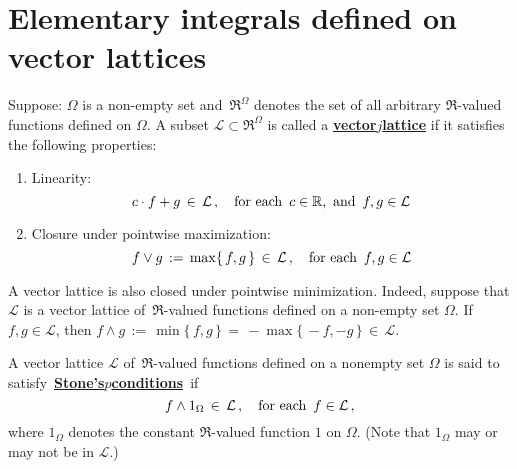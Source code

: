 

\section{Elementary integrals defined on vector lattices}
\setcounter{theorem}{0}
\setcounter{equation}{0}


\renewcommand{\theenumi}{\roman{enumi}}
\renewcommand{\labelenumi}{\textnormal{(\theenumi)}$\;\;$}


\begin{definition}
\mbox{}\vskip 0.1cm
\noindent
Suppose:\;\; $\Omega$ is a non-empty set and \,$\Re^{\Omega}$ denotes the set of all arbitrary $\Re$-valued functions
defined on $\Omega$. A subset $\mathcal{L} \subset \Re^{\Omega}$ is called a
\underline{\textbf{vector{\color{white}$j$\!}lattice}} if it satisfies the following properties:
\begin{enumerate}
\item
	Linearity:
	\begin{equation*}
	c \cdot f + g \,\in\, \mathcal{L}\,,
	\quad
	\textnormal{for each \,$c\in\Re$,\, and \,$f,g\in\mathcal{L}$}
	\end{equation*}
\item
	Closure under pointwise maximization:
	\begin{equation*}
	f \vee g \,:=\, \max\{\,f,g\,\} \,\in\, \mathcal{L}\,,
	\quad
	\textnormal{for each \,$f,g\in\mathcal{L}$}
	\end{equation*}
\end{enumerate}
\end{definition}

\begin{remark}\quad
A vector lattice is also closed under pointwise minimization.
Indeed, suppose that $\mathcal{L}$ is a vector lattice of
\,$\Re$-valued functions defined on a non-empty set $\Omega$.
If $f, g \in \mathcal{L}$, then
$f \wedge g \,:=\, \min\{\,f,g\,\} \,=\, -\max\{\,-f,-g\,\} \,\in\, \mathcal{L}$.
\end{remark}


\begin{definition}
\mbox{}\vskip 0.1cm
\noindent
A vector lattice $\mathcal{L}$ of \,$\Re$-valued functions defined on a nonempty set $\Omega$
is said to satisfy \,\underline{\textbf{Stone's{\color{white}$p$\!}conditions}}\, if
\begin{equation*}
f \wedge 1_{\Omega} \,\in\, \mathcal{L}\,,
\quad\textnormal{for each \,$f \in \mathcal{L}$}\,,
\end{equation*}
where $1_{\Omega}$ denotes the constant $\Re$-valued function $1$ on $\Omega$.
(Note that $1_{\Omega}$ may or may not be in $\mathcal{L}$.)
\end{definition}

